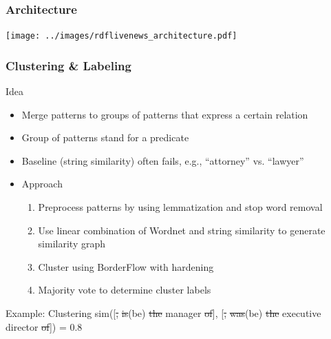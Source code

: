 \documentclass{beamer}
\begin{document}
\begin{frame}
    \frametitle{Architecture}
        \texttt{[image: ../images/rdflivenews\_architecture.pdf]}
\end{frame}



\begin{frame}
    \frametitle{Clustering \& Labeling}
\begin{block}{Idea}
\begin{itemize}
        \item Merge patterns to groups of patterns that express a certain relation
	\item Group of patterns stand for a predicate
\end{itemize}
\end{block}
\pause
    \begin{itemize}
        \item Baseline (string similarity) often fails, e.g., ``attorney'' vs. ``lawyer''
\pause
\item Approach
\begin{enumerate}
	\item Preprocess patterns by using lemmatization and stop word removal
        \item Use linear combination of Wordnet and string similarity  to generate similarity graph 
        \item Cluster using BorderFlow with hardening
        \item Majority vote to determine cluster labels
    \end{enumerate}
    \end{itemize}
    \begin{block}{Example: Clustering}
        sim([\sout{,} \sout{is}(be) \sout{the} manager \sout{of}], [\sout{,} \sout{was}(be) \sout{the} executive director \sout{of}]) = 0.8
    \end{block}
\end{frame}
\end{document}
